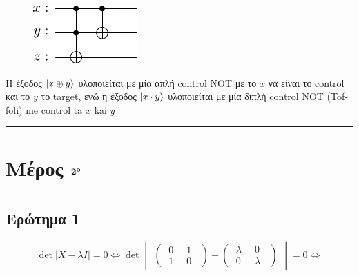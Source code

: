 \documentclass[12pt]{article}
\begin{document}
 \begin{figure}[H]
    
    \centering
    \includegraphics[scale=1]{adderrqiskit.png}\\
\end{figure}
H έξοδος $\ket{x\oplus y}$ υλοποιείται με μία απλή \textlatin{control NOT} με το $x$ να είναι το \textlatin{control} και το $y$ το \textlatin{target},
 ενώ η έξοδος $\ket{x\cdot y}$ υλοποιείται με μία διπλή \textlatin{control NOT} (\textlatin{Toffoli}) me \textlatin{control} ta $x$ kai $y$
 \rule{\textwidth}{.5pt}

 \section*{{\bf Μέρος  $\bf 2^o$ }}
 \section*{{}}
 \subsection*{{\bf Ερώτημα 1}}
 $$ \det |X-\lambda I| = 0 \Leftrightarrow \det \begin{vmatrix}\begin{pmatrix}\;0 \;\; & 1 \;\;\\ \;1 \;\; & 0 \;\;\end{pmatrix} -\begin{pmatrix}\;\lambda \;\; & 0 \;\;\\\;0 \;\; & \lambda \;\;\end{pmatrix}\end{vmatrix}  =0 \Leftrightarrow$$
\end{document}

